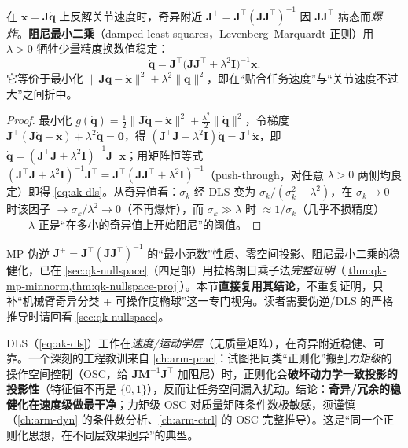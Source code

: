 \begin{theorem}\label{thm:ak-dls}
在 $\dot{\mathbf{x}}=\mathbf{J}\dot{\mathbf{q}}$ 上反解关节速度时，奇异附近 $\mathbf{J}^{+}=\mathbf{J}^\top(\mathbf{J}\mathbf{J}^\top)^{-1}$ 因 $\mathbf{J}\mathbf{J}^\top$ 病态而\emph{爆炸}。\textbf{阻尼最小二乘}（damped least squares，Levenberg--Marquardt 正则）用 $\lambda>0$ 牺牲少量精度换数值稳定\cite{spong2006robot,lynch2017modern}：
\begin{equation}
  \boxed{\dot{\mathbf{q}}=\mathbf{J}^\top\big(\mathbf{J}\mathbf{J}^\top+\lambda^2\mathbf{I}\big)^{-1}\dot{\mathbf{x}}.}
  \label{eq:ak-dls}
\end{equation}
它等价于最小化 $\|\mathbf{J}\dot{\mathbf{q}}-\dot{\mathbf{x}}\|^2+\lambda^2\|\dot{\mathbf{q}}\|^2$，即在“贴合任务速度”与“关节速度不过大”之间折中。
\end{theorem}
\begin{proof}
最小化 $g(\dot{\mathbf{q}})=\tfrac12\|\mathbf{J}\dot{\mathbf{q}}-\dot{\mathbf{x}}\|^2+\tfrac{\lambda^2}{2}\|\dot{\mathbf{q}}\|^2$，令梯度 $\mathbf{J}^\top(\mathbf{J}\dot{\mathbf{q}}-\dot{\mathbf{x}})+\lambda^2\dot{\mathbf{q}}=\mathbf{0}$，得 $(\mathbf{J}^\top\mathbf{J}+\lambda^2\mathbf{I})\dot{\mathbf{q}}=\mathbf{J}^\top\dot{\mathbf{x}}$，即 $\dot{\mathbf{q}}=(\mathbf{J}^\top\mathbf{J}+\lambda^2\mathbf{I})^{-1}\mathbf{J}^\top\dot{\mathbf{x}}$；用矩阵恒等式 $(\mathbf{J}^\top\mathbf{J}+\lambda^2\mathbf{I})^{-1}\mathbf{J}^\top=\mathbf{J}^\top(\mathbf{J}\mathbf{J}^\top+\lambda^2\mathbf{I})^{-1}$（push-through，对任意 $\lambda>0$ 两侧均良定）即得 \cref{eq:ak-dls}。从奇异值看：$\sigma_k$ 经 DLS 变为 $\sigma_k/(\sigma_k^2+\lambda^2)$，在 $\sigma_k\to0$ 时该因子 $\to\sigma_k/\lambda^2\to0$（不再爆炸），而 $\sigma_k\gg\lambda$ 时 $\approx1/\sigma_k$（几乎不损精度）——$\lambda$ 正是“在多小的奇异值上开始阻尼”的阈值。
\end{proof}

\begin{note}\label{note:ak-dls-reuse}
MP 伪逆 $\mathbf{J}^{+}=\mathbf{J}^\top(\mathbf{J}\mathbf{J}^\top)^{-1}$ 的“最小范数”性质、零空间投影、阻尼最小二乘的稳健化，已在 \cref{sec:qk-nullspace}（四足部）用拉格朗日乘子法\emph{完整证明}（\cref{thm:qk-mp-minnorm,thm:qk-nullspace-proj}）。本节\textbf{直接复用其结论}，不重复证明，只补“机械臂奇异分类 + 可操作度椭球”这一专门视角。读者需要伪逆/DLS 的严格推导时请回看 \cref{sec:qk-nullspace}。
\end{note}

\begin{pitfall}
DLS（\cref{eq:ak-dls}）工作在\emph{速度/运动学层}（无质量矩阵），在奇异附近稳健、可靠。一个深刻的工程教训来自 \cref{ch:arm-prac}：试图把同类“正则化”搬到\emph{力矩级}的操作空间控制（OSC，给 $\mathbf{J}\mathbf{M}^{-1}\mathbf{J}^\top$ 加阻尼）时，正则化会\textbf{破坏动力学一致投影的投影性}（特征值不再是 $\{0,1\}$），反而让任务空间漏入扰动。结论：\textbf{奇异/冗余的稳健化在速度级做最干净}；力矩级 OSC 对质量矩阵条件数极敏感，须谨慎（\cref{ch:arm-dyn} 的条件数分析、\cref{ch:arm-ctrl} 的 OSC 完整推导）。这是“同一个正则化思想，在不同层效果迥异”的典型。
\end{pitfall}

